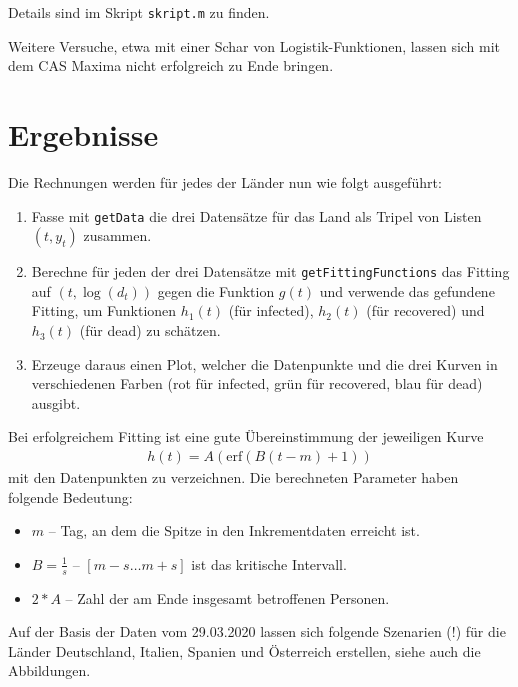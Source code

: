 \documentclass[a4paper,11pt]{article}
\newcommand{\br}[1]{\left(#1\right)}
\newcommand{\erf}{\mathrm{erf}}
\begin{document}
Details sind im Skript \texttt{skript.m} zu finden.

Weitere Versuche, etwa mit einer Schar von Logistik-Funktionen, lassen sich
mit dem CAS Maxima nicht erfolgreich zu Ende bringen. 

\section{Ergebnisse}

Die Rechnungen werden für jedes der Länder nun wie folgt ausgeführt:
\begin{enumerate}
\item Fasse mit \texttt{getData} die drei Datensätze für das Land als Tripel
  von Listen $(t,y_t)$ zusammen. 
\item Berechne für jeden der drei Datensätze mit \texttt{getFittingFunctions}
  das Fitting auf $(t,\log(d_t))$ gegen die Funktion $g(t)$ und verwende das
  gefundene Fitting, um Funktionen $h_1(t)$ (für infected), $h_2(t)$ (für
  recovered) und $h_3(t)$ (für dead) zu schätzen. 
\item Erzeuge daraus einen Plot, welcher die Datenpunkte und die drei Kurven
  in verschiedenen Farben (rot für infected, grün für recovered, blau für
  dead) ausgibt.  
\end{enumerate}
Bei erfolgreichem Fitting ist eine gute Übereinstimmung der jeweiligen Kurve
\begin{gather*}
  h(t)=A\br{\erf\br{B(t-m)+1}}
\end{gather*}
mit den Datenpunkten zu verzeichnen.  Die berechneten Parameter haben folgende
Bedeutung:
\begin{itemize}
\item $m$ -- Tag, an dem die Spitze in den Inkrementdaten erreicht ist.
\item $B=\frac{1}{s}$ -- $[m-s \ldots m+s]$ ist das kritische Intervall.
\item $2*A$ -- Zahl der am Ende insgesamt betroffenen Personen. 
\end{itemize}

Auf der Basis der Daten vom 29.03.2020 lassen sich folgende Szenarien (!) für
die Länder Deutschland, Italien, Spanien und Österreich erstellen, siehe auch
die Abbildungen.
\end{document}
